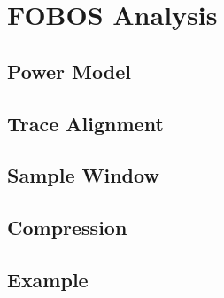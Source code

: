 \chapter{FOBOS Analysis}
\section{Power Model}
\section{Trace Alignment}
\section{Sample Window}
\section{Compression}
\section{Example}
